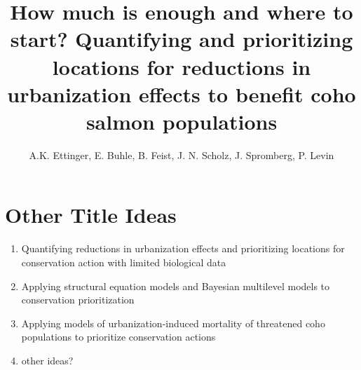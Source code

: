 \documentclass{article}
\begin{document}
 
\title{How much is enough and where to start? Quantifying and prioritizing locations for reductions in urbanization effects to benefit coho salmon populations} %

\author{A.K. Ettinger, E. Buhle, B. Feist, J. N. Scholz, J. Spromberg, P. Levin}
\maketitle  %

\section*{Other Title Ideas}
\begin{enumerate}

\item Quantifying reductions in urbanization effects and prioritizing locations for conservation action with limited biological data
\item Applying structural equation models and Bayesian multilevel models to conservation prioritization
\item Applying models of urbanization-induced mortality of threatened coho populations to prioritize conservation actions
\item other ideas?
\end{enumerate}
\end{document}
